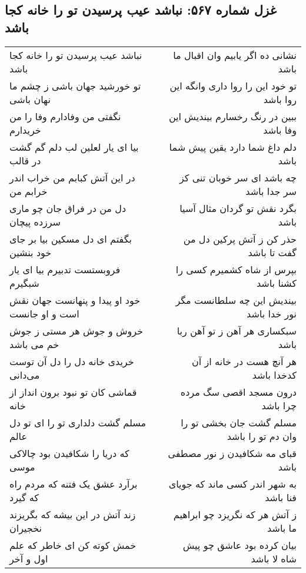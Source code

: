 \begin{center}
\section*{غزل شماره ۵۶۷: نباشد عیب پرسیدن تو را خانه کجا باشد}
\label{sec:0567}
\begin{longtable}{l p{0.5cm} r}
نباشد عیب پرسیدن تو را خانه کجا باشد
&&
نشانی ده اگر یابیم وان اقبال ما باشد
\\
تو خورشید جهان باشی ز چشم ما نهان باشی
&&
تو خود این را روا داری وانگه این روا باشد
\\
نگفتی من وفادارم وفا را من خریدارم
&&
ببین در رنگ رخسارم بیندیش این وفا باشد
\\
بیا ای یار لعلین لب دلم گم گشت در قالب
&&
دلم داغ شما دارد یقین پیش شما باشد
\\
در این آتش کبابم من خراب اندر خرابم من
&&
چه باشد ای سر خوبان تنی کز سر جدا باشد
\\
دل من در فراق جان چو ماری سرزده پیچان
&&
بگرد نقش تو گردان مثال آسیا باشد
\\
بگفتم ای دل مسکین بیا بر جای خود بنشین
&&
حذر کن ز آتش پرکین دل من گفت تا باشد
\\
فروبستست تدبیرم بیا ای یار شبگیرم
&&
بپرس از شاه کشمیرم کسی را کشنا باشد
\\
خود او پیدا و پنهانست جهان نقش است و او جانست
&&
بیندیش این چه سلطانست مگر نور خدا باشد
\\
خروش و جوش هر مستی ز جوش خم می باشد
&&
سبکساری هر آهن ز تو آهن ربا باشد
\\
خریدی خانه دل را دل آن توست می‌دانی
&&
هر آنچ هست در خانه از آن کدخدا باشد
\\
قماشی کان تو نبود برون انداز از خانه
&&
درون مسجد اقصی سگ مرده چرا باشد
\\
مسلم گشت دلداری تو را ای تو دل عالم
&&
مسلم گشت جان بخشی تو را وان دم تو را باشد
\\
که دریا را شکافیدن بود چالاکی موسی
&&
قبای مه شکافیدن ز نور مصطفی باشد
\\
برآرد عشق یک فتنه که مردم راه که گیرد
&&
به شهر اندر کسی ماند که جویای فنا باشد
\\
زند آتش در این بیشه که بگریزند نخجیران
&&
ز آتش هر که نگریزد چو ابراهیم ما باشد
\\
خمش کوته کن ای خاطر که علم اول و آخر
&&
بیان کرده بود عاشق چو پیش شاه لا باشد
\\
\end{longtable}
\end{center}
